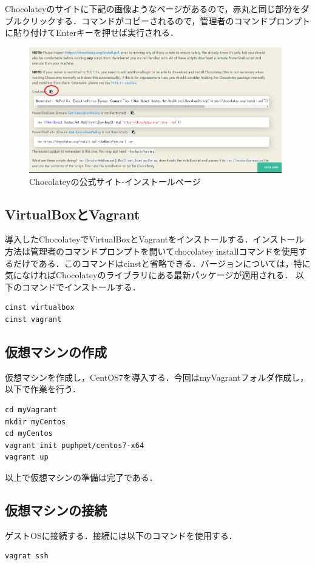 Chocolateyのサイトに下記の画像ようなページがあるので，赤丸と同じ部分をダブルクリックする．コマンドがコピーされるので，管理者のコマンドプロンプトに貼り付けてEnterキーを押せば実行される．

\begin{figure}[h]
\centering
\includegraphics[width=11cm]{choco2.png}
\caption{Chocolateyの公式サイト-インストールページ}
\end{figure}

\newpage

\subsection{VirtualBoxとVagrant}
導入したChocolateyでVirtualBoxとVagrantをインストールする．インストール方法は管理者のコマンドプロンプトを開いてchocolatey installコマンドを使用するだけである．このコマンドはcinstと省略できる．バージョンについては，特に気になければChocolateyのライブラリにある最新パッケージが適用される．
以下のコマンドでインストールする．
\begin{lstlisting}[basicstyle=\ttfamily\footnotesize, frame=single]
cinst virtualbox
cinst vagrant
\end{lstlisting}

\subsection{仮想マシンの作成}
仮想マシンを作成し，CentOS7を導入する．今回はmyVagrantフォルダ作成し，以下で作業を行う．

\begin{lstlisting}[basicstyle=\ttfamily\footnotesize, frame=single]
cd myVagrant
mkdir myCentos
cd myCentos
vagrant init puphpet/centos7-x64
vagrant up
\end{lstlisting}
\hfil

以上で仮想マシンの準備は完了である．

\subsection{仮想マシンの接続}
ゲストOSに接続する．接続には以下のコマンドを使用する．
\begin{lstlisting}[basicstyle=\ttfamily\footnotesize, frame=single]
vagrat ssh
\end{lstlisting}

